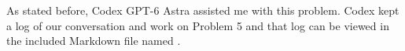 \documentclass[12pt]{article}
\begin{document}
\begin{enumerate}
As stated before, Codex GPT-6 Astra assisted me with this problem. Codex kept a log of our conversation and work on Problem 5 and that log can be viewed in the included Markdown file named . 

\end{enumerate}

\nocite{papernot2018deep,bergman2020deep}


\end{document}
